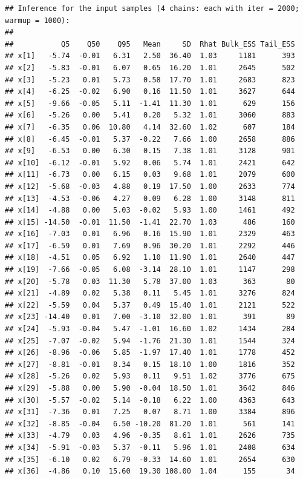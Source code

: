 \documentclass[american,]{article}
\begin{document}
\begin{verbatim}
## Inference for the input samples (4 chains: each with iter = 2000; warmup = 1000):
## 
##           Q5    Q50    Q95   Mean     SD  Rhat Bulk_ESS Tail_ESS
## x[1]   -5.74  -0.01   6.31   2.50  36.40  1.03     1181      393
## x[2]   -5.83  -0.01   6.07   0.65  16.20  1.01     2645      502
## x[3]   -5.23   0.01   5.73   0.58  17.70  1.01     2683      823
## x[4]   -6.25  -0.02   6.90   0.16  11.50  1.01     3627      644
## x[5]   -9.66  -0.05   5.11  -1.41  11.30  1.01      629      156
## x[6]   -5.26   0.00   5.41   0.20   5.32  1.01     3060      883
## x[7]   -6.35   0.06  10.80   4.14  32.60  1.02      607      184
## x[8]   -6.45  -0.01   5.37  -0.22   7.66  1.00     2658      886
## x[9]   -6.53   0.00   6.30   0.15   7.38  1.01     3128      901
## x[10]  -6.12  -0.01   5.92   0.06   5.74  1.01     2421      642
## x[11]  -6.73   0.00   6.15   0.03   9.68  1.01     2079      600
## x[12]  -5.68  -0.03   4.88   0.19  17.50  1.00     2633      774
## x[13]  -4.53  -0.06   4.27   0.09   6.28  1.00     3148      811
## x[14]  -4.88   0.00   5.03  -0.02   5.93  1.00     1461      492
## x[15] -14.50  -0.01  11.50  -1.41  22.70  1.03      486      160
## x[16]  -7.03   0.01   6.96   0.16  15.90  1.01     2329      463
## x[17]  -6.59   0.01   7.69   0.96  30.20  1.01     2292      446
## x[18]  -4.51   0.05   6.92   1.10  11.90  1.01     2640      447
## x[19]  -7.66  -0.05   6.08  -3.14  28.10  1.01     1147      298
## x[20]  -5.78   0.03  11.30   5.78  37.00  1.03      363       80
## x[21]  -4.89   0.02   5.38   0.11   5.45  1.01     3276      824
## x[22]  -5.59   0.04   5.37   0.49  15.40  1.01     2121      522
## x[23] -14.40   0.01   7.00  -3.10  32.00  1.01      391       89
## x[24]  -5.93  -0.04   5.47  -1.01  16.60  1.02     1434      284
## x[25]  -7.07  -0.02   5.94  -1.76  21.30  1.01     1544      324
## x[26]  -8.96  -0.06   5.85  -1.97  17.40  1.01     1778      452
## x[27]  -8.81  -0.01   8.34   0.15  18.10  1.00     1816      352
## x[28]  -5.26   0.02   5.93   0.11   9.51  1.02     3776      675
## x[29]  -5.88   0.00   5.90  -0.04  18.50  1.01     3642      846
## x[30]  -5.57  -0.02   5.14  -0.18   6.22  1.00     4363      643
## x[31]  -7.36   0.01   7.25   0.07   8.71  1.00     3384      896
## x[32]  -8.85  -0.04   6.50 -10.20  81.20  1.01      561      141
## x[33]  -4.79   0.03   4.96  -0.35   8.61  1.01     2626      735
## x[34]  -5.91  -0.03   5.37  -0.11   5.96  1.01     2408      634
## x[35]  -6.10   0.02   6.79  -0.33  14.60  1.01     2654      630
## x[36]  -4.86   0.10  15.60  19.30 108.00  1.04      155       34

\end{verbatim}
\end{document}
